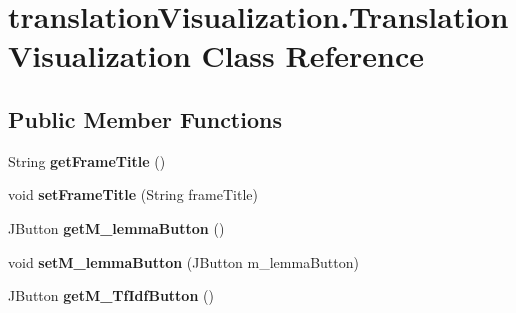 \hypertarget{classtranslation_visualization_1_1_translation_visualization}{}\section{translation\+Visualization.\+Translation\+Visualization Class Reference}
\label{classtranslation_visualization_1_1_translation_visualization}
\subsection*{Public Member Functions}
\begin{DoxyCompactItemize}
\item 
\mbox{\label{classtranslation_visualization_1_1_translation_visualization_a3b8103061db8a490b5a82e648a4e6c72}} 
String {\bfseries get\+Frame\+Title} ()
\item 
\mbox{\label{classtranslation_visualization_1_1_translation_visualization_ad4ec1b5698ba4c099d5c995c384c6acd}} 
void {\bfseries set\+Frame\+Title} (String frame\+Title)
\item 
\mbox{\label{classtranslation_visualization_1_1_translation_visualization_ab441b4354b1393c2cdd755758cfda9f6}} 
J\+Button {\bfseries get\+M\+\_\+lemma\+Button} ()
\item 
\mbox{\label{classtranslation_visualization_1_1_translation_visualization_a95d88d464799023c0fa82b4e10838fbd}} 
void {\bfseries set\+M\+\_\+lemma\+Button} (J\+Button m\+\_\+lemma\+Button)
\item 
\mbox{\label{classtranslation_visualization_1_1_translation_visualization_a83bcf9e54b9b997e4db120683baebde4}} 
J\+Button {\bfseries get\+M\+\_\+\+Tf\+Idf\+Button} ()
\item 
\mbox{\label{classtranslation_visualization_1_1_translation_visualization_a9c9512d86dd40366ca5d36cd737d986d}} 

\end{DoxyCompactItemize}
